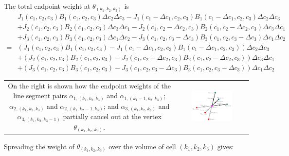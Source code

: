 \documentclass{book}
\begin{document}
The total endpoint weight at \(\theta_{(k_1, k_2, k_3)}\) is 
\begin{align*}
& J_1(c_1,c_2,c_3) B_1(c_1, c_2, c_3) \Delta c_2 \Delta c_3 - J_1(c_1 - \Delta c_1,c_2,c_3) B_1(c_1 - \Delta c_1, c_2, c_3) \Delta c_2 \Delta c_3 \\ 
& + J_2(c_1,c_2,c_3) B_2(c_1, c_2, c_3) \Delta c_3 \Delta c_1 - J_2(c_1,c_2 - \Delta c_2,c_3) B_2(c_1, c_2 - \Delta c_2, c_3) \Delta c_3 \Delta c_1 \\
& + J_3(c_1,c_2,c_3) B_3(c_1, c_2, c_3) \Delta c_1 \Delta c_2 - J_3(c_1,c_2,c_3 - \Delta c_3) B_3(c_1, c_2, c_3 - \Delta c_3) \Delta c_1 \Delta c_2 \\
= & (J_1(c_1,c_2,c_3) B_1(c_1, c_2, c_3) - J_1(c_1 - \Delta c_1,c_2,c_3) B_1(c_1 - \Delta c_1, c_2, c_3)) \Delta c_2 \Delta c_3 \\ 
& + (J_2(c_1,c_2,c_3) B_2(c_1, c_2, c_3) - J_2(c_1,c_2 - \Delta c_2,c_3) B_2(c_1, c_2 - \Delta c_2, c_3)) \Delta c_3 \Delta c_1 \\ 
& + (J_3(c_1,c_2,c_3) B_3(c_1, c_2, c_3) - J_3(c_1,c_2,c_3 - \Delta c_3) B_3(c_1, c_2, c_3 - \Delta c_3)) \Delta c_1 \Delta c_2  
\end{align*}

\begin{tabular}{cc}
\parbox{0.4\textwidth}{
On the right is shown how the endpoint weights of the line segment pairs \(\alpha_{1,(k_1,k_2,k_3)}\) and \(\alpha_{1,(k_1-1,k_2,k_3)}\); \(\alpha_{2,(k_1,k_2,k_3)}\) and \(\alpha_{2,(k_1,k_2-1,k_3)}\); and \(\alpha_{3,(k_1,k_2,k_3)}\) and \(\alpha_{3,(k_1,k_2,k_3-1)}\) partially cancel out at the vertex \(\theta_{(k_1,k_2,k_3)}\).
} & \parbox{0.6\textwidth}{
\includegraphics[width = 0.6\textwidth]{Coordinate_systems/path_endpoint_cell}
}
\end{tabular}

Spreading the weight of \(\theta_{(k_1, k_2, k_3)}\) over the volume of cell \((k_1, k_2, k_3)\) gives:
\end{document}
